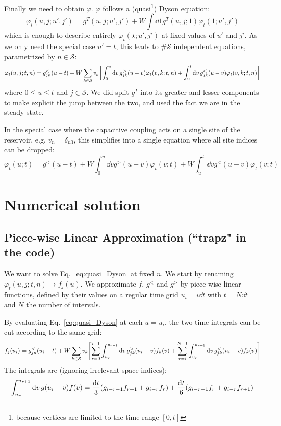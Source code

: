 \documentclass[12pt]{article}
\begin{document}
Finally we need to obtain $\varphi$. 
$\varphi$ follows a (quasi\footnote{because vertices are limited to the time range $[0, t]$}) Dyson equation:
\begin{equation}
	\varphi_t(u, j; u', j') = g^T(u, j; u', j') + W \int \dd{1} g^T(u, j; 1) \varphi_t(1; u', j')
\end{equation}
which is enough to describe entirely $\varphi_t(\star; u', j')$ at fixed values of $u'$ and $j'$. As we only need the special case $u' = t$, this leads to $\# \mathcal{S}$ independent equations, parametrized by $n \in \mathcal{S}$:
\begin{equation}
	\label{eq:quasi_Dyson}
	\varphi_t(u, j; t, n) = g_{jn}^<(u - t) + W \sum_{k \in \mathcal{S}} v_k \qty[ \int_0^u \dd{v} g_{jk}^>(u - v) \varphi_t(v, k; t, n) + \int_u^t \dd{v} g_{jk}^<(u - v) \varphi_t(v, k; t, n) ]
\end{equation}
where $0 \le u \le t$ and $j \in \mathcal{S}$.
We did split $g^T$ into its greater and lesser components to make explicit the jump between the two, and used the fact we are in the steady-state.

In the special case where the capacitive coupling acts on a single site of the reservoir, e.g. $v_n = \delta_{n0}$, this simplifies into a single equation where all site indices can be dropped:
\begin{equation}
	\label{eq:quasi_Dyson_single_site}
	\varphi_t(u; t) = g^<(u - t) + W \int_0^u \dd{v} g^>(u - v) \varphi_t(v; t) + W \int_u^t \dd{v} g^<(u - v) \varphi_t(v; t)
\end{equation}


\section{Numerical solution}

\subsection{Piece-wise Linear Approximation (``trapz" in the code)}

We want to solve Eq.~\eqref{eq:quasi_Dyson} at fixed $n$. We start by renaming $\varphi_t(u, j; t, n) \rightarrow f_j(u)$.
We approximate $f$, $g^<$ and $g^>$ by piece-wise linear functions, defined by their values on a regular time grid $u_i = i \dd{t}$ with $t = N \dd{t}$ and $N$ the number of intervals.

By evaluating Eq.~\eqref{eq:quasi_Dyson} at each $u=u_i$, the two time integrals can be cut according to the same grid:
\begin{equation}
	f_j(u_i) = g_{jn}^<(u_i - t) + W \sum_{k \in \mathcal{S}} v_k \qty[ \sum_{r=0}^{i-1}\int_{u_r}^{u_{r+1}} \dd{v} g_{jk}^>(u_i - v) f_k(v) + \sum_{r=i}^{N-1} \int_{u_r}^{u_{r+1}} \dd{v} g_{jk}^<(u_i - v) f_k(v) ]
\end{equation}
The integrals are (ignoring irrelevant space indices):
\begin{equation}
	\int_{u_r}^{u_{r+1}} \dd{v} g(u_i - v) f(v) =
	\frac{\dd{t}}{3} \qty(g_{i - r - 1} f_{r+1} + g_{i-r} f_r) +
	\frac{\dd{t}}{6} \qty(g_{i-r-1} f_r + g_{i-r} f_{r+1})
\end{equation}
\end{document}
